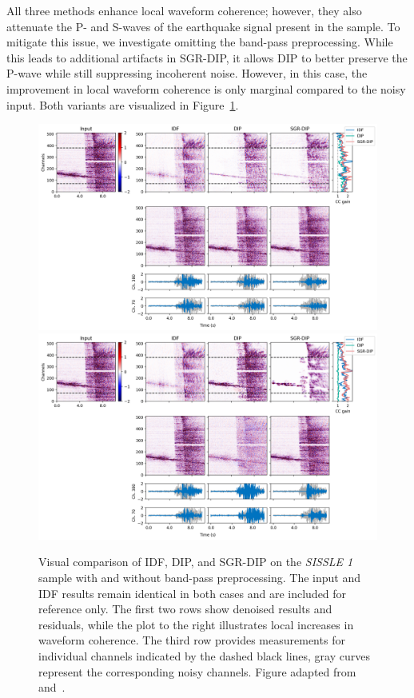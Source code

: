 All three methods enhance local waveform coherence; however, they also attenuate the P- and S-waves of the earthquake signal present in the sample.
To mitigate this issue, we investigate omitting the band-pass preprocessing.
While this leads to additional artifacts in SGR-DIP, it allows DIP to better preserve the P-wave while still suppressing incoherent noise.
However, in this case, the improvement in local waveform coherence is only marginal compared to the noisy input. 
Both variants are visualized in Figure~\ref{fig:SISSLE}.

\begin{figure}
    \centering
    \includegraphics[width=\textwidth]{img/fig_6.6_1.png}\\
    \vspace{20pt}
    \includegraphics[width=\textwidth]{img/fig_6.6_2.png}
    \caption{
        Visual comparison of IDF, DIP, and SGR-DIP on the \textit{SISSLE 1} sample with and without band-pass preprocessing.
        The input and IDF results remain identical in both cases and are included for reference only.
        The first two rows show denoised results and residuals, while the plot to the right illustrates local increases in waveform coherence.
        The third row provides measurements for individual channels indicated by the dashed black lines, gray curves represent the corresponding noisy channels.
        Figure adapted from~\cite{DAS-CN2S} and~\cite{DAS-N2S}.
    }\label{fig:SISSLE}
\end{figure}
